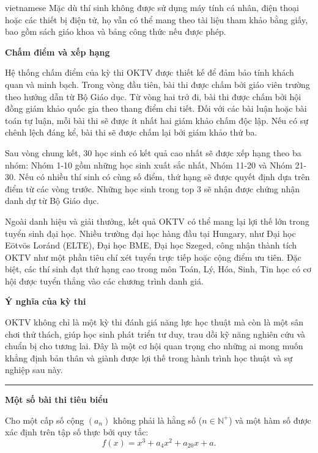 \documentclass{article}
\begin{document}
\begin{otherlanguage*}{vietnamese}
Mặc dù thí sinh không được sử dụng máy tính cá nhân, điện thoại hoặc các thiết bị điện tử, họ vẫn có thể mang theo tài liệu tham khảo bằng giấy,
bao gồm sách giáo khoa và bảng công thức nếu được phép.

\textbf{Chấm điểm và xếp hạng}

Hệ thống chấm điểm của kỳ thi OKTV được thiết kế để đảm bảo tính khách quan và minh bạch. Trong vòng đầu tiên, bài thi được chấm bởi giáo viên trường theo hướng dẫn từ Bộ Giáo dục.
Từ vòng hai trở đi, bài thi được chấm bởi hội đồng giám khảo quốc gia theo thang điểm chi tiết. Đối với các bài luận hoặc bài toán tự luận, mỗi bài thi sẽ được ít nhất hai giám khảo chấm độc lập.
Nếu có sự chênh lệch đáng kể, bài thi sẽ được chấm lại bởi giám khảo thứ ba.

Sau vòng chung kết, 30 học sinh có kết quả cao nhất sẽ được xếp hạng theo ba nhóm: Nhóm 1-10 gồm những học sinh xuất sắc nhất, Nhóm 11-20 và Nhóm 21-30.
Nếu có nhiều thí sinh có cùng số điểm, thứ hạng sẽ được quyết định dựa trên điểm từ các vòng trước. Những học sinh trong top 3 sẽ nhận được chứng nhận danh dự từ Bộ Giáo dục.

Ngoài danh hiệu và giải thưởng, kết quả OKTV có thể mang lại lợi thế lớn trong tuyển sinh đại học.
Nhiều trường đại học hàng đầu tại Hungary, như Đại học Eötvös Loránd (ELTE), Đại học BME, Đại học Szeged,
công nhận thành tích OKTV như một phần tiêu chí xét tuyển trực tiếp hoặc cộng điểm ưu tiên.
Đặc biệt, các thí sinh đạt thứ hạng cao trong môn Toán, Lý, Hóa, Sinh, Tin học có cơ hội được tuyển thẳng vào các chương trình danh giá.

\textbf{Ý nghĩa của kỳ thi}

OKTV không chỉ là một kỳ thi đánh giá năng lực học thuật mà còn là một sân chơi thử thách, giúp học sinh phát triển tư duy, trau dồi kỹ năng nghiên cứu và chuẩn bị cho tương lai.
Đây là một cơ hội quan trọng cho những ai mong muốn khẳng định bản thân và giành được lợi thế trong hành trình học thuật và sự nghiệp sau này.

\bigbreak

\noindent\rule{16.5cm}{0.4pt}

\textbf{Một số bài thi tiêu biểu}

\bigbreak

\begin{problem*}
    Cho một cấp số cộng \( (a_n) \) không phải là hằng số (\( n \in \mathbb{N}^+ \)) và một hàm số được xác định trên tập số thực bởi quy tắc:
    \[
        f(x) = x^3 + a_{4} x^2 + a_{20} x + a.
    \]
    

\end{problem*}
\end{otherlanguage*}
\end{document}
